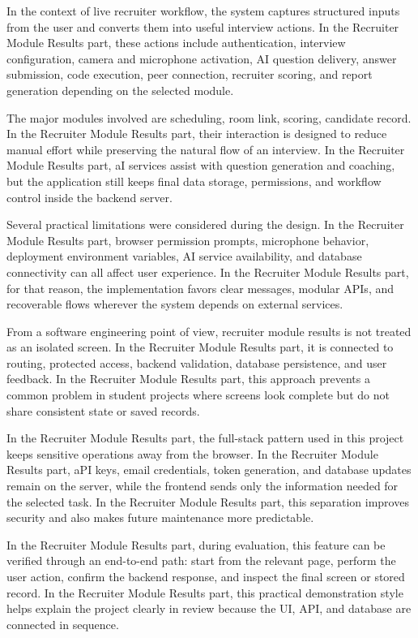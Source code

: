 \documentclass[12pt,a4paper]{report}
\begin{document}
In the context of live recruiter workflow, the system captures structured inputs from the user and converts them into useful interview actions. In the Recruiter Module Results part, these actions include authentication, interview configuration, camera and microphone activation, AI question delivery, answer submission, code execution, peer connection, recruiter scoring, and report generation depending on the selected module.


The major modules involved are scheduling, room link, scoring, candidate record. In the Recruiter Module Results part, their interaction is designed to reduce manual effort while preserving the natural flow of an interview. In the Recruiter Module Results part, aI services assist with question generation and coaching, but the application still keeps final data storage, permissions, and workflow control inside the backend server.


Several practical limitations were considered during the design. In the Recruiter Module Results part, browser permission prompts, microphone behavior, deployment environment variables, AI service availability, and database connectivity can all affect user experience. In the Recruiter Module Results part, for that reason, the implementation favors clear messages, modular APIs, and recoverable flows wherever the system depends on external services.


From a software engineering point of view, recruiter module results is not treated as an isolated screen. In the Recruiter Module Results part, it is connected to routing, protected access, backend validation, database persistence, and user feedback. In the Recruiter Module Results part, this approach prevents a common problem in student projects where screens look complete but do not share consistent state or saved records.


In the Recruiter Module Results part, the full-stack pattern used in this project keeps sensitive operations away from the browser. In the Recruiter Module Results part, aPI keys, email credentials, token generation, and database updates remain on the server, while the frontend sends only the information needed for the selected task. In the Recruiter Module Results part, this separation improves security and also makes future maintenance more predictable.


In the Recruiter Module Results part, during evaluation, this feature can be verified through an end-to-end path: start from the relevant page, perform the user action, confirm the backend response, and inspect the final screen or stored record. In the Recruiter Module Results part, this practical demonstration style helps explain the project clearly in review because the UI, API, and database are connected in sequence.
\end{document}
